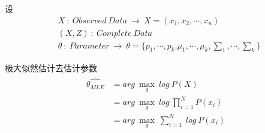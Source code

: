 设
\begin{eqnarray}
    & X\ :\ Observed\ Data\ \rightarrow\ X=(x_1,x_2,\cdots,x_n)\\
    & (X,Z)\ :\ Complete\ Data\\
    & \theta\ :\ Parameter\ \rightarrow\ \theta=\{p_1,\cdots,p_k.\mu_1,\cdots,\mu_k,\sum_1,\cdots,\sum_k\}
\end{eqnarray}

极大似然估计去估计参数
\begin{eqnarray}
    \begin{aligned}
        \hat{\theta_{MLE}} & = arg\ \max\limits_{\theta}\ log\ P(X)\\
        & = arg\ \max\limits_{\theta}\ log\ \prod\limits_{i=1}^{N}P(x_i)\\
        & = arg\ \max\limits_{\theta}\ \sum\limits_{i=1}^{N}\ log\ P(x_i)
    \end{aligned}
\end{eqnarray}


